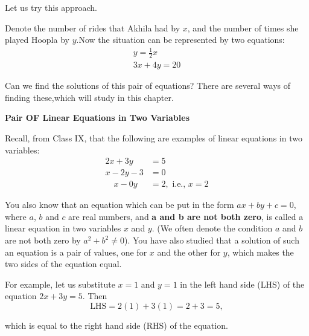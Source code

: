 \documentclass{article}
\begin{document}
\setlength{\parindent}{1.5em}
\setlength{\parskip}{0pt}
\vspace{1em}
\begin{custom}
{\fontsize{12}{14.5}\selectfont

    \noindent Let us try this approach.
    
   \hspace{1.5em}
    Denote the number of rides that Akhila had by $x$, and the number of times she played Hoopla by $y$.Now the situation can be represented by two equations:
        \begin{align}
            y=\frac{1}{2}x\\
            3x+4y=20
            \end{align}
    
    \hspace{1.5em}    
    Can we find the solutions of this pair of equations? There are several ways of finding these,which will study in this chapter.

   
    \noindent \textbf{\textcolor{ncertcyan}{ \large P\large air OF \large L\large inear \large E\large quations in \large T\large wo \large V\large ariables}}

\justifying
\noindent
Recall, from Class IX, that the following are examples of linear equations in two variables:
\vspace{-1em}
\begin{align*}
    2x + 3y &= 5 \\
    x - 2y - 3 &= 0 \\
    \quad x - 0y &= 2, \text{ i.e., } x = 2
\end{align*}
\par
{You also know that an equation which can be put in the form $ax + by + c = 0$, where $a$, $b$ and $c$ are real numbers, and \textbf{a and b are not both zero}, is called a linear equation in two variables $x$ and $y$. (We often denote the condition $a$ and $b$ are not both zero by $a^2 + b^2 \neq 0$). You have also studied that a solution of such an equation is a pair of values, one for $x$ and the other for $y$, which makes the two sides of the equation equal.}

 For example, let us substitute $x = 1$ and $y = 1$ in the left hand side (LHS) of the equation $2x + 3y = 5$. Then
\vspace{-1em}
\[
\text{LHS} = 2(1) + 3(1) = 2 + 3 = 5,
\]

\hspace{6em}
which is equal to the right hand side (RHS) of the equation.

}
\end{custom}
\end{document}
